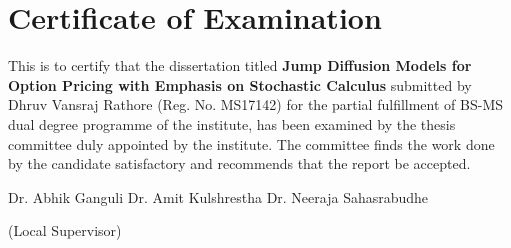 \documentclass[12pt]{report}
\begin{document}
\newpage
{}
\section*{Certificate of Examination}
This is to certify that the dissertation titled \textbf{Jump Diffusion Models for Option Pricing with Emphasis on Stochastic Calculus} submitted by Dhruv Vansraj Rathore (Reg. No. MS17142) for the partial fulfillment of BS-MS dual degree programme of the institute, has been examined by the thesis committee duly appointed by the institute. The committee finds the work done by the candidate satisfactory and recommends that the report be accepted.

\vspace{4cm}

Dr. Abhik Ganguli \hspace{1cm} Dr. Amit Kulshrestha \hspace{1cm} 
Dr. Neeraja Sahasrabudhe\par
\hspace{11cm}(Local Supervisor)

\vspace{4cm}
\end{document}
